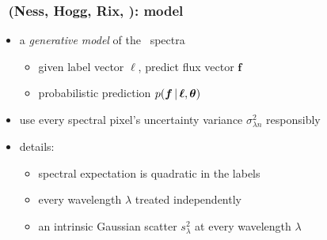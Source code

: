 \documentclass[pdftex]{beamer}
\newcommand{\credits}{{\footnotesize (Ness, Hogg, Rix, \etal)}}
\begin{document}
\newcommand{\flux}{f}
\newcommand{\fluxes}{\boldsymbol{\flux}}
\newcommand{\labels}{\boldsymbol{\ell}}
\newcommand{\pars}{\boldsymbol{\theta}}

\begin{frame}
  \frametitle{\tc\ \credits: model}
  \begin{itemize}
  \item a \emph{generative model} of the \apogee\ spectra
    \begin{itemize}
    \item given label vector $\labels$, predict flux vector $\fluxes$
    \item probabilistic prediction $p(\fluxes\given\labels,\pars)$
    \end{itemize}
  \item use every spectral pixel's uncertainty variance $\sigma^2_{\lambda n}$ responsibly
  \item details:
    \begin{itemize}
    \item spectral expectation is quadratic in the labels
    \item every wavelength $\lambda$ treated independently
    \item an intrinsic Gaussian scatter $s^2_\lambda$ at every wavelength $\lambda$
    \end{itemize}
  \end{itemize}
\end{frame}
\end{document}
